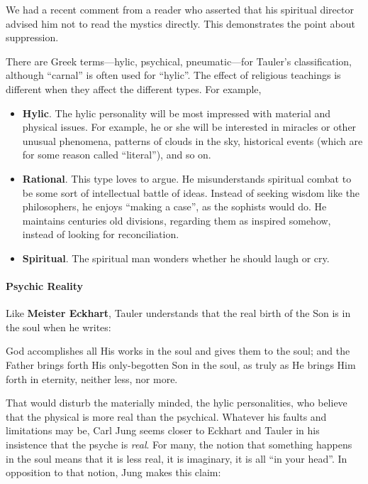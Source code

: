 We had a recent comment from a reader who asserted that his spiritual director advised him not to read the mystics directly. This demonstrates the point about suppression.

There are Greek terms---hylic, psychical, pneumatic---for Tauler's classification, although ``carnal'' is often used for ``hylic''. The effect of religious teachings is different when they affect the different types. For example,

\begin{itemize}


\item \textbf{Hylic}. The hylic personality will be most impressed with material and physical issues. For example, he or she will be interested in miracles or other unusual phenomena, patterns of clouds in the sky, historical events (which are for some reason called ``literal''), and so on.

\item \textbf{Rational}. This type loves to argue. He misunderstands spiritual combat to be some sort of intellectual battle of ideas. Instead of seeking wisdom like the philosophers, he enjoys ``making a case'', as the sophists would do. He maintains centuries old divisions, regarding them as inspired somehow, instead of looking for reconciliation.

\item \textbf{Spiritual}. The spiritual man wonders whether he should laugh or cry.
\end{itemize}


\paragraph{Psychic Reality}


Like \textbf{Meister Eckhart}, Tauler understands that the real birth of the Son is in the soul when he writes:

\begin{quotex}
God accomplishes all His works in the soul and gives them to the soul; and the Father brings forth His only-begotten Son in the soul, as truly as He brings Him forth in eternity, neither less, nor more.
\end{quotex}


That would disturb the materially minded, the hylic personalities, who believe that the physical is more real than the psychical. Whatever his faults and limitations may be, Carl Jung seems closer to Eckhart and Tauler in his insistence that the psyche is \emph{real}. For many, the notion that something happens in the soul means that it is less real, it is imaginary, it is all ``in your head''. In opposition to that notion, Jung makes this claim:

